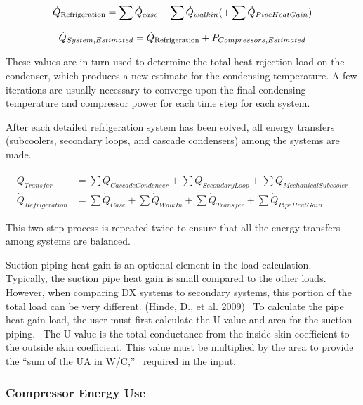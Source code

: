 \begin{equation}
{\dot Q_{{\rm{Refrigeration}}}} = \sum {{{\dot Q}_{case}}}  + \sum {{{\dot Q}_{walkin}}} ( + \sum {{{\dot Q}_{PipeHeatGain}}} )
\end{equation}

\begin{equation}
{\dot Q_{System,Estimated}} = {\dot Q_{{\rm{Refrigeration}}}} + {P_{Compressors,Estimated}}
\end{equation}

These values are in turn used to determine the total heat rejection load on the condenser, which produces a new estimate for the condensing temperature. A few iterations are usually necessary to converge upon the final condensing temperature and compressor power for each time step for each system.

After each detailed refrigeration system has been solved, all energy transfers (subcoolers, secondary loops, and cascade condensers) among the systems are made.

\begin{equation}
  \begin{array}{rl}
    \dot{Q}_{Transfer} &= \sum \dot{Q}_{CascadeCondenser} + \sum \dot{Q}_{SecondaryLoop} + \sum \dot{Q}_{MechanicalSubcooler} \\
    \dot{Q}_{Refrigeration} &= \sum \dot{Q}_{Case} + \sum \dot{Q}_{WalkIn} + \sum \dot{Q}_{Transfer} + \sum \dot{Q}_{PipeHeatGain}
  \end{array}
\end{equation}

This two step process is repeated twice to ensure that all the energy transfers among systems are balanced.

Suction piping heat gain is an optional element in the load calculation.~ Typically, the suction pipe heat gain is small compared to the other loads.~ However, when comparing DX systems to secondary systems, this portion of the total load can be very different. (Hinde, D., et al. 2009) ~To calculate the pipe heat gain load, the user must first calculate the U-value and area for the suction piping.~ The U-value is the total conductance from the inside skin coefficient to the outside skin coefficient. This value must be multiplied by the area to provide the ``sum of the UA in W/C,''~ required in the input.

\subsubsection{Compressor Energy Use}\label{compressor-energy-use-1}


